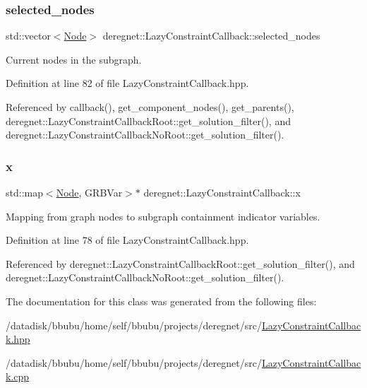 \subsubsection{\texorpdfstring{selected\+\_\+nodes}{selected\_nodes}}
{\footnotesize\ttfamily std\+::vector$<$\hyperlink{namespacederegnet_a744bad34f2de9856d36715a445f027f3}{Node}$>$ deregnet\+::\+Lazy\+Constraint\+Callback\+::selected\+\_\+nodes\hspace{0.3cm}{\ttfamily [protected]}}



Current nodes in the subgraph. 



Definition at line 82 of file Lazy\+Constraint\+Callback.\+hpp.



Referenced by callback(), get\+\_\+component\+\_\+nodes(), get\+\_\+parents(), deregnet\+::\+Lazy\+Constraint\+Callback\+Root\+::get\+\_\+solution\+\_\+filter(), and deregnet\+::\+Lazy\+Constraint\+Callback\+No\+Root\+::get\+\_\+solution\+\_\+filter().

\mbox{\label{classderegnet_1_1LazyConstraintCallback_a48d0e4065232a6dca6e10fe416be755f}} 
\subsubsection{\texorpdfstring{x}{x}}
{\footnotesize\ttfamily std\+::map$<$\hyperlink{namespacederegnet_a744bad34f2de9856d36715a445f027f3}{Node}, G\+R\+B\+Var$>$$\ast$ deregnet\+::\+Lazy\+Constraint\+Callback\+::x\hspace{0.3cm}{\ttfamily [protected]}}



Mapping from graph nodes to subgraph containment indicator variables. 



Definition at line 78 of file Lazy\+Constraint\+Callback.\+hpp.



Referenced by deregnet\+::\+Lazy\+Constraint\+Callback\+Root\+::get\+\_\+solution\+\_\+filter(), and deregnet\+::\+Lazy\+Constraint\+Callback\+No\+Root\+::get\+\_\+solution\+\_\+filter().



The documentation for this class was generated from the following files\+:\begin{DoxyCompactItemize}
\item 
/datadisk/bbubu/home/self/bbubu/projects/deregnet/src/\hyperlink{LazyConstraintCallback_8hpp}{Lazy\+Constraint\+Callback.\+hpp}\item 
/datadisk/bbubu/home/self/bbubu/projects/deregnet/src/\hyperlink{LazyConstraintCallback_8cpp}{Lazy\+Constraint\+Callback.\+cpp}\end{DoxyCompactItemize}
